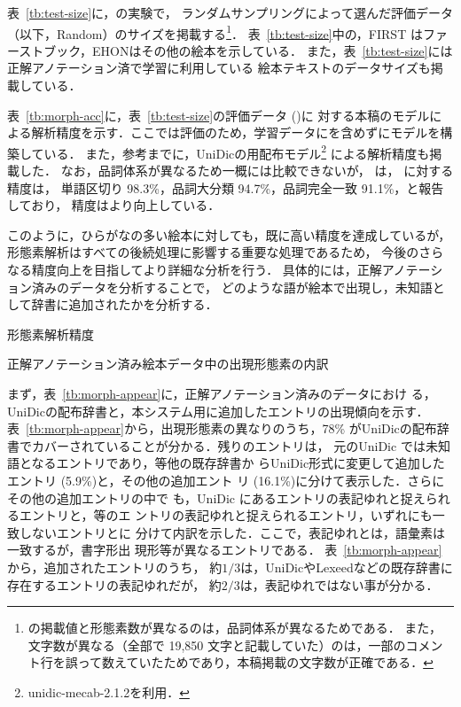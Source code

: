 \documentclass[japanese]{jnlp_1.4}
\newcommand{\random}{}
\newcommand{\mecab}{}
\newcommand{\lxd}{}
\begin{document}
表~\ref{tb:test-size}に，の実験で，
ランダムサンプリングによって選んだ評価データ
（以下，Random）のサイズを掲載する\footnote{
の掲載値と形態素数が異なるのは，品詞体系が異なるためである．
また，文字数が異なる（全部で 19,850 文字と記載していた）のは，一部のコメント行を誤って数えていたためであり，本稿掲載の文字数が正確である．}．
表~\ref{tb:test-size}中の，FIRST はファーストブック，EHONはその他の絵本を示している．
また，表~\ref{tb:test-size}には正解アノテーション済で学習に利用している
絵本テキストのデータサイズも掲載している．


表~\ref{tb:morph-acc}に，表~\ref{tb:test-size}の評価データ (\random{})に
対する本稿のモデルによる解析精度を示す．ここでは評価のため，学習データに\random{}を含めずにモデルを構築している．
また，参考までに，UniDicの\mecab{}用配布モデル\footnote{unidic-mecab-2.1.2を利用．} による解析精度も掲載した．
なお，品詞体系が異なるため一概には比較できないが，
は，
\random に対する精度は，
単語区切り 98.3\%，品詞大分類 94.7\%，品詞完全一致 91.1\%，と報告しており，
精度はより向上している．


このように，ひらがなの多い絵本に対しても，既に高い精度を達成しているが，
形態素解析はすべての後続処理に影響する重要な処理であるため，
今後のさらなる精度向上を目指してより詳細な分析を行う．
具体的には，正解アノテーション済みのデータを分析することで，
どのような語が絵本で出現し，未知語として辞書に追加されたかを分析する．

\begin{table}[t]
\caption{形態素解析精度}
\label{tb:morph-acc}

\end{table}
\begin{table}[t]
\caption{正解アノテーション済み絵本データ中の出現形態素の内訳}
\label{tb:morph-appear}

\end{table}



まず，表~\ref{tb:morph-appear}に，正解アノテーション済みのデータにおけ
る，UniDicの配布辞書と，本システム用に追加したエントリの出現傾向を示す．
表~\ref{tb:morph-appear}から，出現形態素の異なりのうち，78\% がUniDicの配布辞書でカバーされていることが分かる．残りのエントリは，
元のUniDic では未知語となるエントリであり，\lxd{}等他の既存辞書か
らUniDic形式に変更して追加したエントリ (5.9\%)と，その他の追加エント
リ (16.1\%)に分けて表示した．さらにその他の追加エントリの中で
も，UniDic にあるエントリの表記ゆれと捉えられるエントリと，\lxd{}等のエ
ントリの表記ゆれと捉えられるエントリ，いずれにも一致しないエントリとに
分けて内訳を示した．ここで，表記ゆれとは，語彙素は一致するが，書字形出
現形等が異なるエントリである．
表~\ref{tb:morph-appear}から，追加されたエントリのうち，
約$1/3$は，UniDicやLexeedなどの既存辞書に存在するエントリの表記ゆれだが，
約$2/3$は，表記ゆれではない事が分かる．
\end{document}

